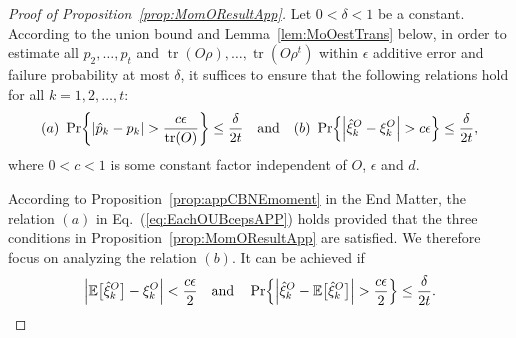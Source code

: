 \documentclass[aps,prl,twocolumn,nofootinbib,superscriptaddress,10pt]{revtex4-2}
\let\originalleft\left
\let\originalright\right
\renewcommand{\left}{\mathopen{}\mathclose\bgroup\originalleft}
\renewcommand{\right}{\aftergroup\egroup\originalright}
\def\E{ {\mathbb E} } %
\DeclareMathOperator{\Tr}{tr}
\theoremstyle{plain}
\theoremstyle{definition}
\newcommand{\eref}[1]{Eq.~\textup{(\ref{#1})}}
\newcommand{\lref}[1]{Lemma~\ref{#1}}
\newcommand{\pref}[1]{Proposition~\ref{#1}}
\begin{document}
\begin{proof}[Proof of \pref{prop:MomOResultApp}]
Let $0<\delta<1$ be a constant. 
According to the union bound and \lref{lem:MoOestTrans} below, in order to estimate all $p_2,\dots,p_t$ and
$\Tr(O\rho),\dots,\Tr(O\rho^t)$ within $\epsilon$ additive error and failure probability at most $\delta$, it 
suffices to ensure that the following relations hold for all $k=1,2,\dots,t$: 
\begin{align}\label{eq:EachOUBcepsAPP}
(a) \ 
\Pr\left\{ \left|\hat{p}_k-p_k\right| > \frac{c\epsilon}{\Tr(O)}  \right\} \leq \frac{\delta}{2t}
\quad \text{and} \quad  
(b) \ 
\Pr\left\{ \left|\hat{\xi}_k^O - \xi_k^O\right| > c\epsilon \right\} \leq \frac{\delta}{2t}, 
\end{align}
where $0<c<1$ is some constant factor independent of $O$, $\epsilon$ and $d$.  


According to \pref{prop:appCBNEmoment} in the End Matter, the relation $(a)$ in \eref{eq:EachOUBcepsAPP} 
holds provided that the three conditions in \pref{prop:MomOResultApp} are satisfied. 
We therefore focus on analyzing the relation $(b)$. It can be achieved if
\begin{align}\label{eq:CondiAppMomO}
\left|\E\big[\hat{\xi}_k^O\big]-\xi_k^O 
\right| < \frac{c\epsilon}{2} 
\quad\text{and}\quad
\Pr\left\{ \left|\hat{\xi}_k^O-\E\big[\hat{\xi}_k^O\big]\right| > \frac{c\epsilon}{2}  \right\} \leq \frac{\delta}{2t}.
\end{align} 


\end{proof}
\end{document}
